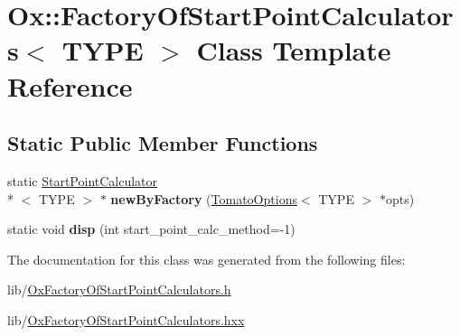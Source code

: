 \hypertarget{class_ox_1_1_factory_of_start_point_calculators}{\section{Ox\-:\-:Factory\-Of\-Start\-Point\-Calculators$<$ T\-Y\-P\-E $>$ Class Template Reference}
\label{class_ox_1_1_factory_of_start_point_calculators}
}
\subsection*{Static Public Member Functions}
\begin{DoxyCompactItemize}
\item 
\hypertarget{class_ox_1_1_factory_of_start_point_calculators_ad8d353d479c4e0592957c9fae97f2ce3}{static \hyperlink{class_ox_1_1_start_point_calculator}{Start\-Point\-Calculator}\\*
$<$ T\-Y\-P\-E $>$ $\ast$ {\bfseries new\-By\-Factory} (\hyperlink{struct_ox_1_1_tomato_options}{Tomato\-Options}$<$ T\-Y\-P\-E $>$ $\ast$opts)}\label{class_ox_1_1_factory_of_start_point_calculators_ad8d353d479c4e0592957c9fae97f2ce3}

\item 
\hypertarget{class_ox_1_1_factory_of_start_point_calculators_ab68ca3710bef131e972cc99b7f4e3797}{static void {\bfseries disp} (int start\-\_\-point\-\_\-calc\-\_\-method=-\/1)}\label{class_ox_1_1_factory_of_start_point_calculators_ab68ca3710bef131e972cc99b7f4e3797}

\end{DoxyCompactItemize}


The documentation for this class was generated from the following files\-:\begin{DoxyCompactItemize}
\item 
lib/\hyperlink{_ox_factory_of_start_point_calculators_8h}{Ox\-Factory\-Of\-Start\-Point\-Calculators.\-h}\item 
lib/\hyperlink{_ox_factory_of_start_point_calculators_8hxx}{Ox\-Factory\-Of\-Start\-Point\-Calculators.\-hxx}\end{DoxyCompactItemize}
